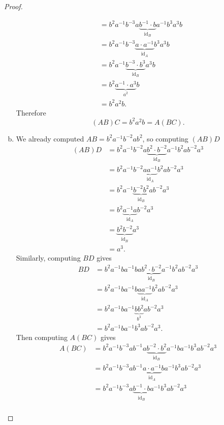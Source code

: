 \documentclass{article}
\begin{document}
\begin{proof}
\begin{enumerate}[(a)]
\begin{align*}
         &= b^2 a^{-1} b^{-3} a \underbrace{b^{-1} \cdot b}_{\operatorname{id}_B} a^{-1} b^3 a^3 b \\
         &= b^2 a^{-1} b^{-3} \underbrace{a \cdot a^{-1}}_{\operatorname{id}_A} b^3 a^3 b \\
         &= b^2 a^{-1} \underbrace{b^{-3} \cdot b^{3}}_{\operatorname{id}_B} a^3 b \\
         &= b^2 \underbrace{a^{-1} \cdot a^3}_{a^2} b \\
         &= b^2 a^2 b.
    \end{align*}
    Therefore \[
      (AB)C = b^2a^2b = A(BC).
    \]
    \item We already computed $AB = b^2 a^{-1} b^{-2} a b^{2}$, so computing
    $(AB)D$ \begin{align*}
      (AB)D &= b^2 a^{-1} b^{-2} a \underbrace{b^{2} \cdot b^{-2}}_{\operatorname{id}_B} a^{-1} b^2 a b^{-2} a^3 \\
         &= b^2 a^{-1} b^{-2} \underbrace{a a^{-1}}_{\operatorname{id}_A} b^2 a b^{-2} a^3 \\
         &= b^2 a^{-1} \underbrace{b^{-2} b^2}_{\operatorname{id}_B} a b^{-2} a^3 \\
         &= b^2 \underbrace{a^{-1} a}_{\operatorname{id}_A} b^{-2} a^3 \\
         &= \underbrace{b^2 b^{-2}}_{\operatorname{id}_B} a^3 \\
         &= a^3.
    \end{align*}
    Similarly, computing $BD$ gives \begin{align*}
      BD &= b^2 a^{-1} b a^{-1} b a \underbrace{b^{2} \cdot b^{-2}}_{\operatorname{id}_B} a^{-1} b^2 a b^{-2} a^3 \\
         &= b^2 a^{-1} b a^{-1} b \underbrace{a a^{-1}}_{\operatorname{id}_A} b^2 a b^{-2} a^3 \\
         &= b^2 a^{-1} b a^{-1} \underbrace{b b^{2}}_{b^3} a b^{-2} a^3 \\
         &= b^2 a^{-1} b a^{-1} b^3 a b^{-2} a^3.
    \end{align*}
    Then computing $A(BC)$ gives \begin{align*}
      A(BC) &= b^2 a^{-1} b^{-3} a b^{-1} a \underbrace{b^{-2} \cdot b^{2}}_{\operatorname{id}_B} a^{-1} b a^{-1} b^3 a b^{-2} a^3 \\
         &= b^2 a^{-1} b^{-3} a b^{-1} \underbrace{a \cdot a^{-1}}_{\operatorname{id}_A} b a^{-1} b^3 a b^{-2} a^3 \\
         &= b^2 a^{-1} b^{-3} a \underbrace{b^{-1} \cdot b}_{\operatorname{id}_B} a^{-1} b^3 a b^{-2} a^3 \\

\end{align*}
\end{enumerate}
\end{proof}
\end{document}
